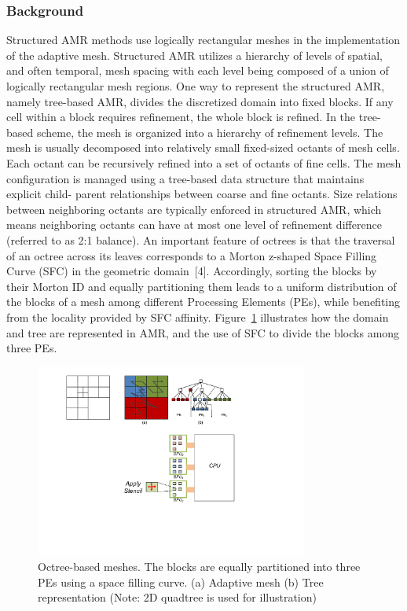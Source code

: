 \documentclass{book}
\begin{document}
\subsubsection{Background}
Structured AMR methods use logically rectangular meshes in the implementation of the adaptive mesh. Structured AMR utilizes a hierarchy of levels of spatial, and often temporal, mesh spacing with each level being composed of a union of logically rectangular mesh regions. One way to represent the structured AMR, namely tree-based AMR, divides the discretized domain into fixed blocks. If any cell within a block requires refinement, the whole block is refined.
In the tree-based scheme, the mesh is organized into a hierarchy of refinement levels. The mesh is usually decomposed into relatively small fixed-sized octants of mesh cells. Each octant can be recursively refined into a set of octants of fine cells. The mesh configuration is managed using a tree-based data structure that maintains explicit child- parent relationships between coarse and fine octants. Size relations between neighboring octants are typically enforced in structured AMR, which means neighboring octants can have at most one level of refinement difference (referred to as 2:1 balance). An important feature of octrees is that the traversal of an octree across its leaves corresponds to a Morton z-shaped Space Filling Curve (SFC) in the geometric domain~[4]. Accordingly, sorting the blocks by their Morton ID and equally partitioning them leads to a uniform distribution of the blocks of a mesh among different Processing Elements (PEs), while benefiting from the locality provided by SFC affinity. Figure~\ref{fig:1} illustrates how the domain and tree are represented in AMR, and the use of SFC to divide the blocks among three PEs.
\begin{figure}[h]
\centering
\includegraphics[width=0.8\textwidth]{figs/amr01.pdf}%
\caption{Octree-based meshes. The blocks are equally partitioned into three PEs using a space filling curve. (a) Adaptive mesh (b) Tree representation (Note: 2D quadtree is used for illustration)}
\label{fig:1}
\end{figure}
\end{document}
